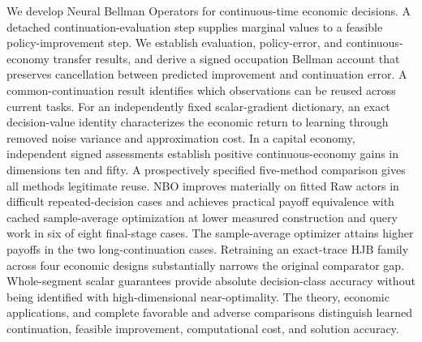 We develop Neural Bellman Operators for continuous-time economic decisions. A detached continuation-evaluation step supplies marginal values to a feasible policy-improvement step. We establish evaluation, policy-error, and continuous-economy transfer results, and derive a signed occupation Bellman account that preserves cancellation between predicted improvement and continuation error. A common-continuation result identifies which observations can be reused across current tasks. For an independently fixed scalar-gradient dictionary, an exact decision-value identity characterizes the economic return to learning through removed noise variance and approximation cost. In a capital economy, independent signed assessments establish positive continuous-economy gains in dimensions ten and fifty. A prospectively specified five-method comparison gives all methods legitimate reuse. NBO improves materially on fitted Raw actors in difficult repeated-decision cases and achieves practical payoff equivalence with cached sample-average optimization at lower measured construction and query work in six of eight final-stage cases. The sample-average optimizer attains higher payoffs in the two long-continuation cases. Retraining an exact-trace HJB family across four economic designs substantially narrows the original comparator gap. Whole-segment scalar guarantees provide absolute decision-class accuracy without being identified with high-dimensional near-optimality. The theory, economic applications, and complete favorable and adverse comparisons distinguish learned continuation, feasible improvement, computational cost, and solution accuracy.
